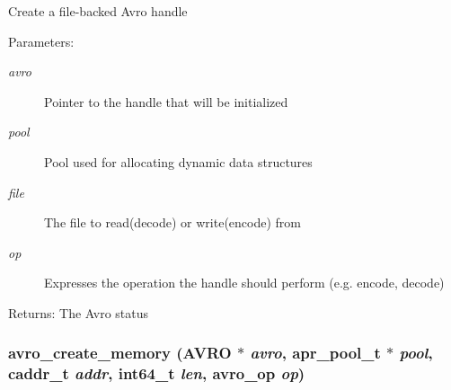 Create a file-backed Avro handle \begin{Desc}
\item[Parameters:]
\begin{description}
\item[{\em avro}]Pointer to the handle that will be initialized \item[{\em pool}]Pool used for allocating dynamic data structures \item[{\em file}]The file to read(decode) or write(encode) from \item[{\em op}]Expresses the operation the handle should perform (e.g. encode, decode) \end{description}
\end{Desc}
\begin{Desc}
\item[Returns:]The Avro status \end{Desc}
\hypertarget{group___handle___routines_ga8d57587e61e593b8878b80163977430}{
\subsubsection[{avro\_\-create\_\-memory}]{ avro\_\-create\_\-memory ({\bf AVRO} $\ast$ {\em avro}, \/  apr\_\-pool\_\-t $\ast$ {\em pool}, \/  caddr\_\-t {\em addr}, \/  int64\_\-t {\em len}, \/  {\bf avro\_\-op} {\em op})}}
\label{group___handle___routines_ga8d57587e61e593b8878b80163977430}


